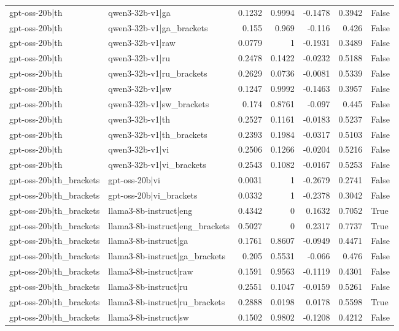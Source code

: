 \begin{table}
\begin{tabular}{l l r r r r l}
gpt-oss-20b|th & qwen3-32b-v1|ga & 0.1232 & 0.9994 & -0.1478 & 0.3942 & False \\
gpt-oss-20b|th & qwen3-32b-v1|ga_brackets & 0.155 & 0.969 & -0.116 & 0.426 & False \\
gpt-oss-20b|th & qwen3-32b-v1|raw & 0.0779 & 1 & -0.1931 & 0.3489 & False \\
gpt-oss-20b|th & qwen3-32b-v1|ru & 0.2478 & 0.1422 & -0.0232 & 0.5188 & False \\
gpt-oss-20b|th & qwen3-32b-v1|ru_brackets & 0.2629 & 0.0736 & -0.0081 & 0.5339 & False \\
gpt-oss-20b|th & qwen3-32b-v1|sw & 0.1247 & 0.9992 & -0.1463 & 0.3957 & False \\
gpt-oss-20b|th & qwen3-32b-v1|sw_brackets & 0.174 & 0.8761 & -0.097 & 0.445 & False \\
gpt-oss-20b|th & qwen3-32b-v1|th & 0.2527 & 0.1161 & -0.0183 & 0.5237 & False \\
gpt-oss-20b|th & qwen3-32b-v1|th_brackets & 0.2393 & 0.1984 & -0.0317 & 0.5103 & False \\
gpt-oss-20b|th & qwen3-32b-v1|vi & 0.2506 & 0.1266 & -0.0204 & 0.5216 & False \\
gpt-oss-20b|th & qwen3-32b-v1|vi_brackets & 0.2543 & 0.1082 & -0.0167 & 0.5253 & False \\
gpt-oss-20b|th_brackets & gpt-oss-20b|vi & 0.0031 & 1 & -0.2679 & 0.2741 & False \\
gpt-oss-20b|th_brackets & gpt-oss-20b|vi_brackets & 0.0332 & 1 & -0.2378 & 0.3042 & False \\
gpt-oss-20b|th_brackets & llama3-8b-instruct|eng & 0.4342 & 0 & 0.1632 & 0.7052 & True \\
gpt-oss-20b|th_brackets & llama3-8b-instruct|eng_brackets & 0.5027 & 0 & 0.2317 & 0.7737 & True \\
gpt-oss-20b|th_brackets & llama3-8b-instruct|ga & 0.1761 & 0.8607 & -0.0949 & 0.4471 & False \\
gpt-oss-20b|th_brackets & llama3-8b-instruct|ga_brackets & 0.205 & 0.5531 & -0.066 & 0.476 & False \\
gpt-oss-20b|th_brackets & llama3-8b-instruct|raw & 0.1591 & 0.9563 & -0.1119 & 0.4301 & False \\
gpt-oss-20b|th_brackets & llama3-8b-instruct|ru & 0.2551 & 0.1047 & -0.0159 & 0.5261 & False \\
gpt-oss-20b|th_brackets & llama3-8b-instruct|ru_brackets & 0.2888 & 0.0198 & 0.0178 & 0.5598 & True \\
gpt-oss-20b|th_brackets & llama3-8b-instruct|sw & 0.1502 & 0.9802 & -0.1208 & 0.4212 & False \\

\end{tabular}
\end{table}
